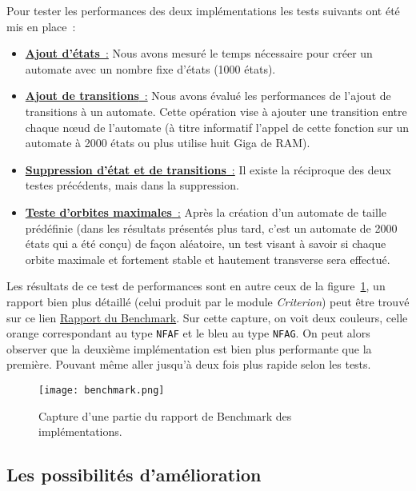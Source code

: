 \vphantom{}

Pour tester les performances des deux implémentations les tests suivants ont été
mis en place~:

\begin{itemize}
    \item[\textbullet] \underline{\textbf{Ajout d'états}~:} Nous avons mesuré le
        temps nécessaire pour créer un automate avec un nombre fixe d'états
        (1000 états).
    \item[\textbullet] \underline{\textbf{Ajout de transitions}~:} Nous avons
        évalué les performances de l'ajout de transitions à un automate.
        Cette opération vise à ajouter une transition entre chaque n\oe ud de
        l'automate (à titre informatif l'appel de cette fonction sur un automate à
        2000 états ou plus utilise huit Giga de RAM).
    \item[\textbullet] \underline{\textbf{Suppression d'état et de transitions}~:}
        Il existe la réciproque des deux testes précédents, mais dans la suppression.
    \item[\textbullet] \underline{\textbf{Teste d'orbites maximales}~:} Après la
        création d'un automate de taille prédéfinie (dans les résultats présentés plus
        tard, c'est un automate de 2000 états qui a été conçu) de façon aléatoire, un
        test visant à savoir si chaque orbite maximale et fortement stable et hautement
        transverse sera effectué.
\end{itemize}

\vphantom{}

Les résultats de ce test de performances sont en autre ceux de la
figure~\ref{fig:imgBench}, un rapport bien plus détaillé (celui produit par le
module \textit{Criterion}) peut être trouvé sur ce lien
\href{run:./report_perf.html}{Rapport du Benchmark}. Sur cette capture, on voit
deux couleurs, celle orange correspondant au type \texttt{NFAF} et
le bleu au type \texttt{NFAG}. On peut alors observer que la
deuxième implémentation est bien plus performante que la première. Pouvant même
aller jusqu'à deux fois plus rapide selon les tests.

\begin{figure}[H]
    \texttt{[image: benchmark.png]}
    \caption{
        Capture d'une partie du rapport de Benchmark des implémentations.
    }\label{fig:imgBench}
\end{figure}

\subsection{Les possibilités d'amélioration}

